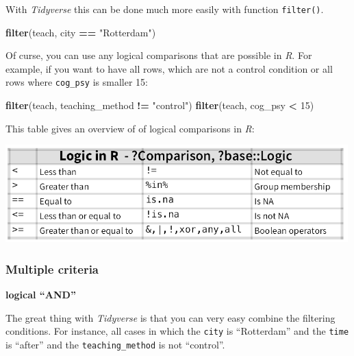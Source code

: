 \documentclass[
]{scrartcl}
\newenvironment{Shaded}{\begin{snugshade}}{\end{snugshade}}
\newcommand{\DecValTok}[1]{\textcolor[rgb]{0.00,0.00,0.81}{#1}}
\newcommand{\KeywordTok}[1]{\textcolor[rgb]{0.13,0.29,0.53}{\textbf{#1}}}
\newcommand{\NormalTok}[1]{#1}
\newcommand{\OperatorTok}[1]{\textcolor[rgb]{0.81,0.36,0.00}{\textbf{#1}}}
\newcommand{\StringTok}[1]{\textcolor[rgb]{0.31,0.60,0.02}{#1}}
\begin{document}
With \emph{Tidyverse} this can be done much more easily with function \texttt{filter()}.

\begin{Shaded}
\begin{Highlighting}[]
\KeywordTok{filter}\NormalTok{(teach, city }\OperatorTok{==}\StringTok{ "Rotterdam"}\NormalTok{)}
\end{Highlighting}
\end{Shaded}

Of curse, you can use any logical comparisons that are possible in \emph{R}. For example, if you want to have all rows, which are not a control condition or all rows where \texttt{cog\_psy} is smaller 15:

\begin{Shaded}
\begin{Highlighting}[]
\KeywordTok{filter}\NormalTok{(teach, teaching\_method }\OperatorTok{!=}\StringTok{ "control"}\NormalTok{)}
\KeywordTok{filter}\NormalTok{(teach, cog\_psy }\OperatorTok{\textless{}}\StringTok{ }\DecValTok{15}\NormalTok{)}
\end{Highlighting}
\end{Shaded}

This table gives an overview of of logical comparisons in \emph{R}:

\begin{center}\includegraphics[width=500px]{images/logic_in_r} \end{center}

\hypertarget{multiple-criteria}{%
\subsubsection{Multiple criteria}\label{multiple-criteria}}

\textbf{logical ``AND''}

The great thing with \emph{Tidyverse} is that you can very easy combine the filtering conditions. For instance, all cases in which the \texttt{city} is ``Rotterdam'' and the \texttt{time} is ``after'' and the \texttt{teaching\_method} is not ``control''.
\end{document}
